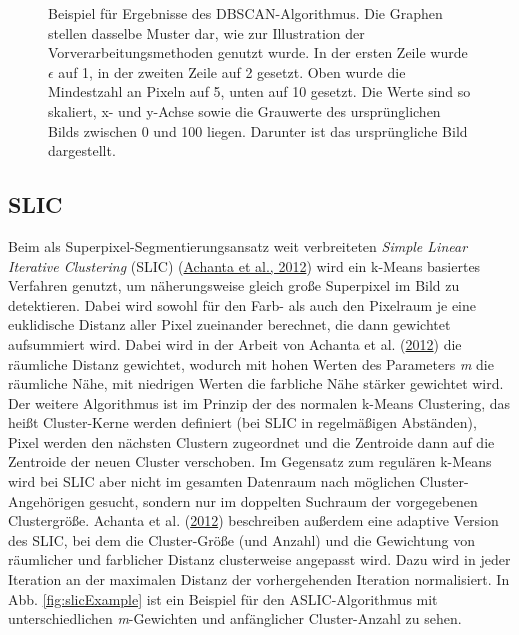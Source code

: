 \documentclass[
  12pt,
  openany]{book}
\begin{document}
\begin{figure}
{}

\caption[Beispiel für Ergebnisse des DBSCAN-Algorithmus.]{Beispiel für Ergebnisse des DBSCAN-Algorithmus. Die Graphen stellen dasselbe Muster dar, wie zur Illustration der Vorverarbeitungsmethoden genutzt wurde. In der ersten Zeile wurde \(\epsilon\) auf 1, in der zweiten Zeile auf 2 gesetzt. Oben wurde die Mindestzahl an Pixeln auf 5, unten auf 10 gesetzt. Die Werte sind so skaliert, x- und y-Achse sowie die Grauwerte des ursprünglichen Bilds zwischen 0 und 100 liegen. Darunter ist das ursprüngliche Bild dargestellt.}\label{fig:dbscanExample}
\end{figure}

\hypertarget{slic}{%
\subsection{SLIC}\label{slic}}

Beim als Superpixel-Segmentierungsansatz weit verbreiteten \emph{Simple Linear Iterative Clustering} (SLIC) (\protect\hyperlink{ref-achantaSLICSuperpixelsCompared2012}{Achanta et al., 2012}) wird ein k-Means basiertes Verfahren genutzt, um näherungsweise gleich große Superpixel im Bild zu detektieren.
Dabei wird sowohl für den Farb- als auch den Pixelraum je eine euklidische Distanz aller Pixel zueinander berechnet, die dann gewichtet aufsummiert wird. Dabei wird in der Arbeit von Achanta et al. (\protect\hyperlink{ref-achantaSLICSuperpixelsCompared2012}{2012}) die räumliche Distanz gewichtet, wodurch mit hohen Werten des Parameters \emph{m} die räumliche Nähe, mit niedrigen Werten die farbliche Nähe stärker gewichtet wird.
Der weitere Algorithmus ist im Prinzip der des normalen k-Means Clustering, das heißt Cluster-Kerne werden definiert (bei SLIC in regelmäßigen Abständen), Pixel werden den nächsten Clustern zugeordnet und die Zentroide dann auf die Zentroide der neuen Cluster verschoben.
Im Gegensatz zum regulären k-Means wird bei SLIC aber nicht im gesamten Datenraum nach möglichen Cluster-Angehörigen gesucht, sondern nur im doppelten Suchraum der vorgegebenen Clustergröße.
Achanta et al. (\protect\hyperlink{ref-achantaSLICSuperpixelsCompared2012}{2012}) beschreiben außerdem eine adaptive Version des SLIC, bei dem die Cluster-Größe (und Anzahl) und die Gewichtung von räumlicher und farblicher Distanz clusterweise angepasst wird. Dazu wird in jeder Iteration an der maximalen Distanz der vorhergehenden Iteration normalisiert.
In Abb. \ref{fig:slicExample} ist ein Beispiel für den ASLIC-Algorithmus mit unterschiedlichen \emph{m}-Gewichten und anfänglicher Cluster-Anzahl zu sehen.
\end{document}
